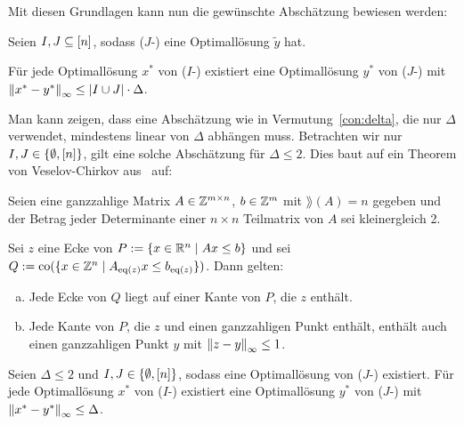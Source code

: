 Mit diesen Grundlagen kann nun die gewünschte Abschätzung bewiesen werden:

\renewcommand{\thetheorem}{2.11}
\begin{theorem}\label{thm:theo2}
	Seien $I,J\subseteq[n]$, sodass ($J$-\MIPI) eine Optimallösung $\tilde{y}$ hat.
	
	Für jede Optimallösung $x^*$ von ($I$-\MIPI) existiert eine Optimallösung $y^*$ von ($J$-\MIPI) mit $\left\lVert x^*-y^*\right\rVert_\infty\leq\lvert I\cup J \rvert\cdot\Delta$.
\end{theorem}

Man kann zeigen, dass eine Abschätzung wie in Vermutung~\ref{con:delta}, die nur $\Delta$ verwendet, mindestens linear von $\Delta$ abhängen muss.
Betrachten wir nur $I,J\in\{\emptyset, [n] \}$, gilt eine solche Abschätzung für $\Delta\leq 2$.
Dies baut auf ein Theorem von Veselov-Chirkov aus~\cite[Theorem 2 und Beweis]{VESELOV2009220} auf:
\begin{lemma}\label{lem:veselov}
	Seien eine ganzzahlige Matrix $A\in\mathbb{Z}^{m\times n}$, $b\in\mathbb{Z}^m$ mit $\rang(A)=n$ gegeben und der Betrag jeder Determinante einer $n\times n$ Teilmatrix von $A$ sei kleinergleich 2.
	
	Sei $z$ eine Ecke von $P:=\{x\in\mathbb{R}^n\mid Ax\leq b \}$ und sei $Q:=\operatorname{co}(\{x\in\mathbb{Z}^n \mid A_{\operatorname{eq}(z)}x \leq b_{\operatorname{eq}(z)} \})$.
	Dann gelten:
	\begin{enumerate}[(a)]
		\item Jede Ecke von $Q$ liegt auf einer Kante von $P$, die $z$ enthält.
		\item Jede Kante von $P$, die $z$ und einen ganzzahligen Punkt enthält, enthält auch einen ganzzahligen Punkt $y$ mit $\left\lVert z -y\right\rVert_\infty\leq 1$.
	\end{enumerate}
\end{lemma}

\begin{theorem}
	Seien $\Delta\leq 2$ und $I,J\in\{\emptyset,[n]\}$, sodass eine Optimallösung von \mbox{($J$-\MIPI)} existiert.
	Für jede Optimallösung $x^*$ von ($I$-\MIPI) existiert eine Optimallösung $y^*$ von ($J$-\MIPI) mit $\left\lVert x^*-y^*\right\rVert_\infty\leq \Delta$.
\end{theorem}
